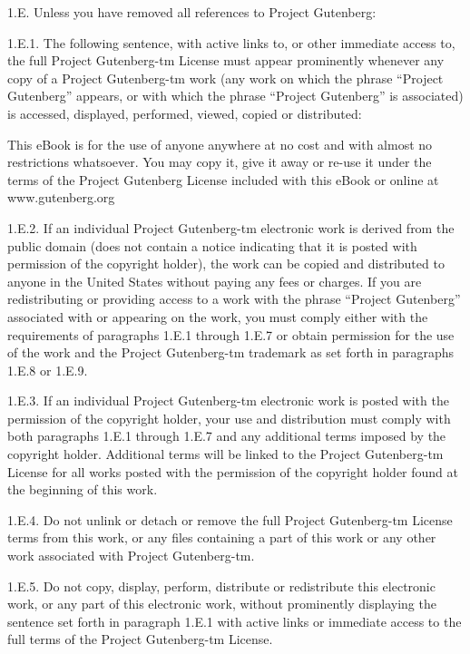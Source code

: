 \documentclass[12pt,oneside]{scrbook}
\begin{document}
  1.E. Unless you have removed all references to Project Gutenberg:
  
  1.E.1. The following sentence, with active links to, or other immediate
  access to, the full Project Gutenberg-tm License must appear prominently
  whenever any copy of a Project Gutenberg-tm work (any work on which the
  phrase ``Project Gutenberg'' appears, or with which the phrase ``Project
  Gutenberg'' is associated) is accessed, displayed, performed, viewed,
  copied or distributed:
  
  This eBook is for the use of anyone anywhere at no cost and with almost
  no restrictions whatsoever. You may copy it, give it away or re-use it
  under the terms of the Project Gutenberg License included with this
  eBook or online at www.gutenberg.org
  
  1.E.2. If an individual Project Gutenberg-tm electronic work is derived
  from the public domain (does not contain a notice indicating that it is
  posted with permission of the copyright holder), the work can be copied
  and distributed to anyone in the United States without paying any fees
  or charges. If you are redistributing or providing access to a work with
  the phrase ``Project Gutenberg'' associated with or appearing on the
  work, you must comply either with the requirements of paragraphs 1.E.1
  through 1.E.7 or obtain permission for the use of the work and the
  Project Gutenberg-tm trademark as set forth in paragraphs 1.E.8 or
  1.E.9.
  
  1.E.3. If an individual Project Gutenberg-tm electronic work is posted
  with the permission of the copyright holder, your use and distribution
  must comply with both paragraphs 1.E.1 through 1.E.7 and any additional
  terms imposed by the copyright holder. Additional terms will be linked
  to the Project Gutenberg-tm License for all works posted with the
  permission of the copyright holder found at the beginning of this work.
  
  1.E.4. Do not unlink or detach or remove the full Project Gutenberg-tm
  License terms from this work, or any files containing a part of this
  work or any other work associated with Project Gutenberg-tm.
  
  1.E.5. Do not copy, display, perform, distribute or redistribute this
  electronic work, or any part of this electronic work, without
  prominently displaying the sentence set forth in paragraph 1.E.1 with
  active links or immediate access to the full terms of the Project
  Gutenberg-tm License.
  
\end{document}
